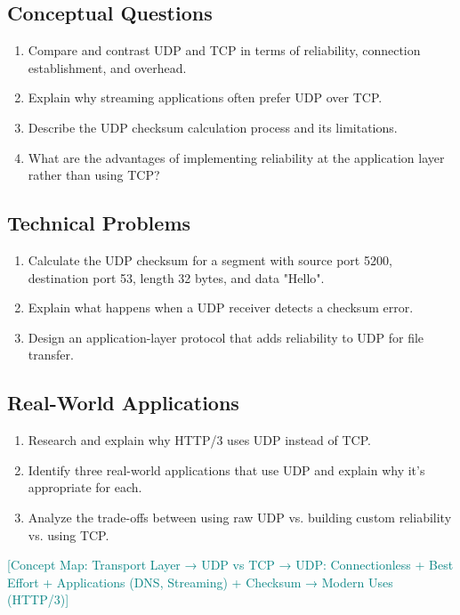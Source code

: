 \documentclass[12pt]{article}
\begin{document}
\subsection{Conceptual Questions}
\begin{enumerate}
    \item Compare and contrast UDP and TCP in terms of reliability, connection establishment, and overhead.
    \item Explain why streaming applications often prefer UDP over TCP.
    \item Describe the UDP checksum calculation process and its limitations.
    \item What are the advantages of implementing reliability at the application layer rather than using TCP?
\end{enumerate}

\subsection{Technical Problems}
\begin{enumerate}
    \item Calculate the UDP checksum for a segment with source port 5200, destination port 53, length 32 bytes, and data "Hello".
    \item Explain what happens when a UDP receiver detects a checksum error.
    \item Design an application-layer protocol that adds reliability to UDP for file transfer.
\end{enumerate}

\subsection{Real-World Applications}
\begin{enumerate}
    \item Research and explain why HTTP/3 uses UDP instead of TCP.
    \item Identify three real-world applications that use UDP and explain why it's appropriate for each.
    \item Analyze the trade-offs between using raw UDP vs. building custom reliability vs. using TCP.
\end{enumerate}

\textcolor{teal}{[Concept Map: Transport Layer → UDP vs TCP → UDP: Connectionless + Best Effort + Applications (DNS, Streaming) + Checksum → Modern Uses (HTTP/3)]}
\end{document}
